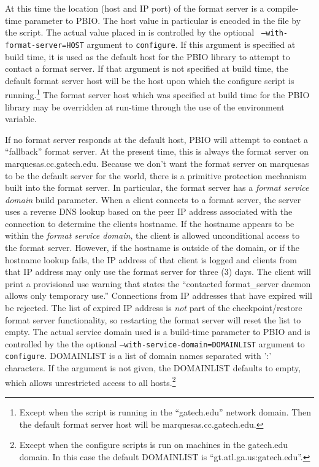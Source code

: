 At this time the location (host and IP port) of the format server is a
compile-time parameter to PBIO.  The host value in particular is encoded in
the file  by the  script.  The
actual value placed in  is controlled by the optional {\tt
--with-format-server=HOST} argument to {\tt configure}.  
If this argument is specified at build time, it is used as the default host
for the PBIO library to attempt to contact a format server.  If that
argument is not specified at build time, the default format server host will
be the host upon which the configure script is running.\footnote{Except when
the script is running in the ``gatech.edu'' network domain.  Then the
default format server host will be marquesas.cc.gatech.edu.}  The format
server host which was specified at build time for the PBIO library may be
overridden at run-time through the use of the 
environment variable.

If no format server responds at the default host, PBIO will attempt to
contact a ``fallback'' format server.  At the present time, this is always
the format server on marquesas.cc.gatech.edu.  Because we don't want the
format server on marquesas to be the default server for the world, there is
a primitive protection mechanism built into the format server.  In
particular, the format server has a {\it format service domain} build
parameter.  When a client connects to a format server, the server uses a
reverse DNS lookup based on the peer IP address associated with the
connection to determine the clients hostname.  If the hostname appears to be
within the {\it format service domain}, the client is allowed unconditional
access to the format server.  However, if the hostname is outside of the
domain, or if the hostname lookup fails, the IP address of that client is
logged and clients from that IP address may only use the format server for
three (3) days.  The client will print a provisional use warning that states
the ``contacted format\_server daemon allows only temporary
use.''  Connections from IP addresses
that have expired will be rejected.  The list of expired IP address is 
{\it not} part of the checkpoint/restore format server functionality, so
restarting the format server will reset the list to empty.  The actual
service domain used is a build-time parameter to PBIO and is controlled by
the the optional {\tt --with-service-domain=DOMAINLIST} argument to {\tt
configure}.  DOMAINLIST is a list of
domain names separated with ':' characters.  If the argument is not given,
the DOMAINLIST defaults to empty, which allows unrestricted access to all
hosts.\footnote{Except when the configure scripts is run on machines in the
gatech.edu domain.  In this case the default DOMAINLIST is
``gt.atl.ga.us:gatech.edu''.} 


